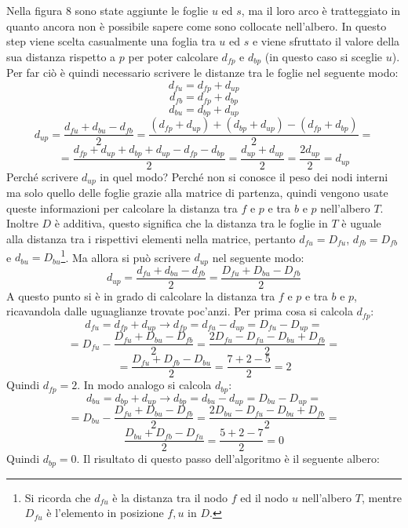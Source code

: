 \newline
Nella figura 8 sono state aggiunte le foglie $u$ ed $s$, ma il loro arco è tratteggiato in quanto ancora non è possibile sapere come sono collocate nell'albero.
\newline
In questo step viene scelta casualmente una foglia tra $u$ ed $s$ e viene sfruttato il valore della sua distanza rispetto a $p$ per poter calcolare $d_{fp}$ e $d_{bp}$ (in questo caso si sceglie $u$). Per far ciò è quindi necessario scrivere le distanze tra le foglie nel seguente modo:
\[d_{fu}=d_{fp}+d_{up}\]
\[d_{fb}=d_{fp}+d_{bp}\]
\[d_{bu}=d_{bp}+d_{up}\]
\[d_{up}=\frac{d_{fu}+d_{bu}-d_{fb}}2=
\frac{(d_{fp}+d_{up})+(d_{bp}+d_{up})-(d_{fp}+d_{bp})}2=\]
\[=\frac{d_{fp}+d_{up}+d_{bp}+d_{up}-d_{fp}-d_{bp}}2=
\frac{d_{up}+d_{up}}2=
\frac{2d_{up}}2=d_{up}
\]
Perché scrivere $d_{up}$ in quel modo? Perché non si conosce il peso dei nodi interni ma solo quello delle foglie grazie alla matrice di partenza, quindi vengono usate queste informazioni per calcolare la distanza tra $f$ e $p$ e tra $b$ e $p$ nell'albero $T$. Inoltre $D$ è additiva, questo significa che la distanza tra le foglie in $T$ è uguale alla distanza tra i rispettivi elementi nella matrice, pertanto $d_{fu}=D_{fu}$, $d_{fb}=D_{fb}$ e $d_{bu}=D_{bu}$\footnote{Si ricorda che $d_{fu}$ è la distanza tra il nodo $f$ ed il nodo $u$ nell'albero $T$, mentre $D_{fu}$ è l'elemento in posizione $f,u$ in $D$.}. Ma allora si può scrivere $d_{up}$ nel seguente modo:
\[d_{up}=\frac{d_{fu}+d_{bu}-d_{fb}}2=\frac{D_{fu}+D_{bu}-D_{fb}}2\]
A questo punto si è in grado di calcolare la distanza tra $f$ e $p$ e tra $b$ e $p$, ricavandola dalle uguaglianze trovate poc'anzi. Per prima cosa si calcola $d_{fp}$:
\[d_{fu}=d_{fp}+d_{up} \rightarrow d_{fp}=d_{fu}-d_{up}=D_{fu}-D_{up}=\]
\[=D_{fu}-\frac{D_{fu}+D_{bu}-D_{fb}}2=\frac{2D_{fu}-D_{fu}-D_{bu}+D_{fb}}2=\]
\[=\frac{D_{fu}+D_{fb}-D_{bu}}2=\frac{7+2-5}2=2\]
Quindi $d_{fp}=2$. In modo analogo si calcola $d_{bp}$:
\[d_{bu}=d_{bp}+d_{up} \rightarrow d_{bp}=d_{bu}-d_{up}=D_{bu}-D_{up}=\]
\[=D_{bu}-\frac{D_{fu}+D_{bu}-D_{fb}}2=\frac{2D_{bu}-D_{fu}-D_{bu}+D_{fb}}2=\]
\[\frac{D_{bu}+D_{fb}-D_{fu}}2=\frac{5+2-7}2=0\]
Quindi $d_{bp}=0$. Il risultato di questo passo dell'algoritmo è il seguente albero:
